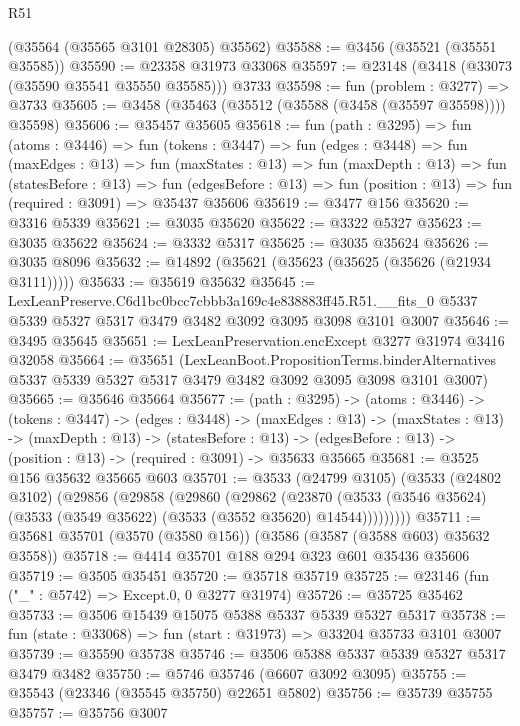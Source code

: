 \begin{lexlean}{R51}
\begin{coremodule}
    (@35564 (@35565 @3101 @28305) @35562)
@35588 := @3456 (@35521 (@35551 @35585))
@35590 := @23358 @31973 @33068
@35597 := @23148 (@3418 (@33073 (@35590 @35541 @35550 @35585))) @3733
@35598 := fun (problem : @3277) => @3733
@35605 := @3458 (@35463 (@35512 (@35588 (@3458 (@35597 @35598)))) @35598)
@35606 := @35457 @35605
@35618 := fun (path : @3295) =>
  fun (atoms : @3446) =>
  fun (tokens : @3447) =>
  fun (edges : @3448) =>
  fun (maxEdges : @13) =>
  fun (maxStates : @13) =>
  fun (maxDepth : @13) =>
  fun (statesBefore : @13) =>
  fun (edgesBefore : @13) => fun (position : @13) => fun (required : @3091) => @35437 @35606
@35619 := @3477 @156
@35620 := @3316 @5339
@35621 := @3035 @35620
@35622 := @3322 @5327
@35623 := @3035 @35622
@35624 := @3332 @5317
@35625 := @3035 @35624
@35626 := @3035 @8096
@35632 := @14892 (@35621 (@35623 (@35625 (@35626 (@21934 @3111)))))
@35633 := @35619 @35632
@35645 := LexLeanPreserve.C6d1bc0bcc7cbbb3a169c4e838883ff45.R51.__fits_0
    @5337
    @5339
    @5327
    @5317
    @3479
    @3482
    @3092
    @3095
    @3098
    @3101
    @3007
@35646 := @3495 @35645
@35651 := LexLeanPreservation.encExcept @3277 @31974 @3416 @32058
@35664 := @35651
    (LexLeanBoot.PropositionTerms.binderAlternatives
      @5337
      @5339
      @5327
      @5317
      @3479
      @3482
      @3092
      @3095
      @3098
      @3101
      @3007)
@35665 := @35646 @35664
@35677 := (path : @3295) ->
  (atoms : @3446) ->
  (tokens : @3447) ->
  (edges : @3448) ->
  (maxEdges : @13) ->
  (maxStates : @13) ->
  (maxDepth : @13) ->
  (statesBefore : @13) ->
  (edgesBefore : @13) -> (position : @13) -> (required : @3091) -> @35633 @35665
@35681 := @3525 @156 @35632 @35665 @603
@35701 := @3533
    (@24799 @3105)
    (@3533
      (@24802 @3102)
      (@29856
        (@29858
          (@29860
            (@29862
              (@23870
                (@3533 (@3546 @35624) (@3533 (@3549 @35622) (@3533 (@3552 @35620) @14544)))))))))
@35711 := @35681 @35701 (@3570 (@3580 @156)) (@3586 (@3587 (@3588 @603) @35632 @3558))
@35718 := @4414 @35701 @188 @294 @323 @601 @35436 @35606
@35719 := @3505 @35451
@35720 := @35718 @35719
@35725 := @23146 (fun ("_" : @5742) => Except.{0, 0} @3277 @31974)
@35726 := @35725 @35462
@35733 := @3506 @15439 @15075 @5388 @5337 @5339 @5327 @5317
@35738 := fun (state : @33068) => fun (start : @31973) => @33204 @35733 @3101 @3007
@35739 := @35590 @35738
@35746 := @3506 @5388 @5337 @5339 @5327 @5317 @3479 @3482
@35750 := @5746 @35746 (@6607 @3092 @3095)
@35755 := @35543 (@23346 (@35545 @35750) @22651 @5802)
@35756 := @35739 @35755
@35757 := @35756 @3007

\end{coremodule}
\end{lexlean}
